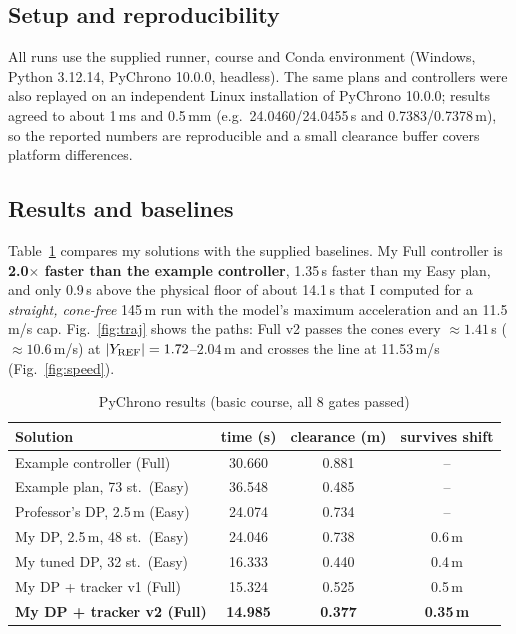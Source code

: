 \documentclass[conference]{IEEEtran}
\begin{document}
\subsection{Setup and reproducibility}
All runs use the supplied runner, course and Conda environment (Windows,
Python 3.12.14, PyChrono 10.0.0, headless). The same plans and controllers were
also replayed on an independent Linux installation of PyChrono 10.0.0; results
agreed to about 1\,ms and 0.5\,mm (e.g.\ 24.0460/24.0455\,s and
0.7383/0.7378\,m), so the reported numbers are reproducible and a small
clearance buffer covers platform differences.

\subsection{Results and baselines}
Table~\ref{tab:results} compares my solutions with the supplied baselines. My
Full controller is \textbf{2.0$\times$ faster than the example controller},
1.35\,s faster than my Easy plan, and only 0.9\,s above the physical floor of
about 14.1\,s that I computed for a \emph{straight, cone-free} 145\,m run with
the model's maximum acceleration and an 11.5\,m/s cap. Fig.~\ref{fig:traj}
shows the paths: Full v2 passes the cones every $\approx1.41$\,s
($\approx10.6$\,m/s) at $|Y_{\rm REF}|=1.72$--$2.04$\,m and crosses the line at
11.53\,m/s (Fig.~\ref{fig:speed}).

\begin{table}[t]
\centering
\caption{PyChrono results (basic course, all 8 gates passed)}
\label{tab:results}
\footnotesize
\setlength{\tabcolsep}{3pt}
\begin{tabular}{@{}lccc@{}}
\toprule
Solution & time (s) & clearance (m) & survives shift \\
\midrule
Example controller (Full) & 30.660 & 0.881 & -- \\
Example plan, 73 st.\ (Easy) & 36.548 & 0.485 & -- \\
Professor's DP, 2.5\,m (Easy) & 24.074 & 0.734 & -- \\
My DP, 2.5\,m, 48 st.\ (Easy) & 24.046 & 0.738 & 0.6\,m \\
My tuned DP, 32 st.\ (Easy) & 16.333 & 0.440 & 0.4\,m \\
My DP + tracker v1 (Full) & 15.324 & 0.525 & 0.5\,m \\
\textbf{My DP + tracker v2 (Full)} & \textbf{14.985} & \textbf{0.377} & \textbf{0.35\,m} \\
\bottomrule
\end{tabular}
\end{table}
\end{document}
